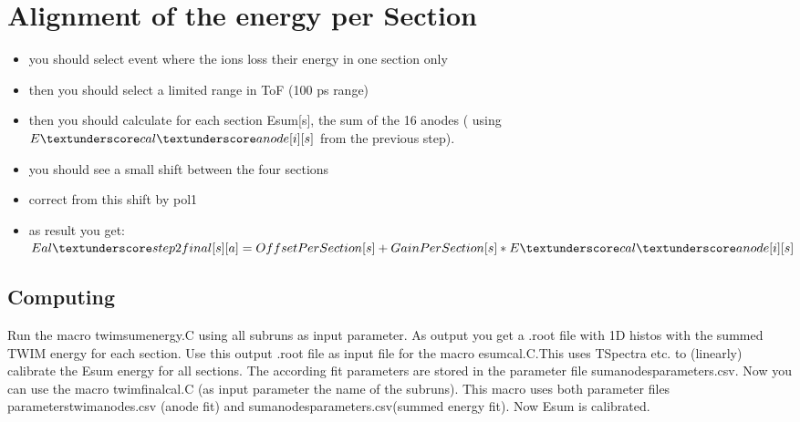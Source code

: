 \documentclass{report}
\begin{document}
\section{Alignment of the energy per Section}
\begin{itemize}
	\item you should select event where the ions loss their energy in one section only
	\item then you should select a limited range in ToF (100 ps range)
	\item then you should calculate for each section Esum[s], the sum of the 16 anodes ( using $E\textunderscore cal\textunderscore anode[i][s]$ from the previous step). 
	\item you should see a small shift between the four sections
	\item correct from this shift by pol1
	\item as result you get: $Eal\textunderscore step2final[s][a] = OffsetPerSection[s] + GainPerSection[s] * E\textunderscore cal\textunderscore anode[i][s]$
\end{itemize}
\subsection{Computing}
Run the macro \dq twim\textunderscore sum\textunderscore energy.C\dq{} using all subruns as input parameter. As output you get a .root file with 1D histos with the summed TWIM energy for each section. Use this output .root file as input file for the macro \dq e\textunderscore sum\textunderscore cal.C\dq{}.This uses TSpectra etc. to (linearly) calibrate the E\textunderscore sum energy for all sections. The according fit parameters are stored in the parameter file \dq sum\textunderscore anodes\textunderscore parameters.csv\dq{}.\newline
Now you can use the macro \dq twim\textunderscore final\textunderscore cal.C\dq{} (as input parameter the name of the subruns). This macro uses both parameter files \dq parameters\textunderscore twim\textunderscore anodes.csv (anode fit) and \dq sum\textunderscore anodes\textunderscore parameters.csv\dq{}(summed energy fit). Now E\textunderscore sum is calibrated.
\end{document}
